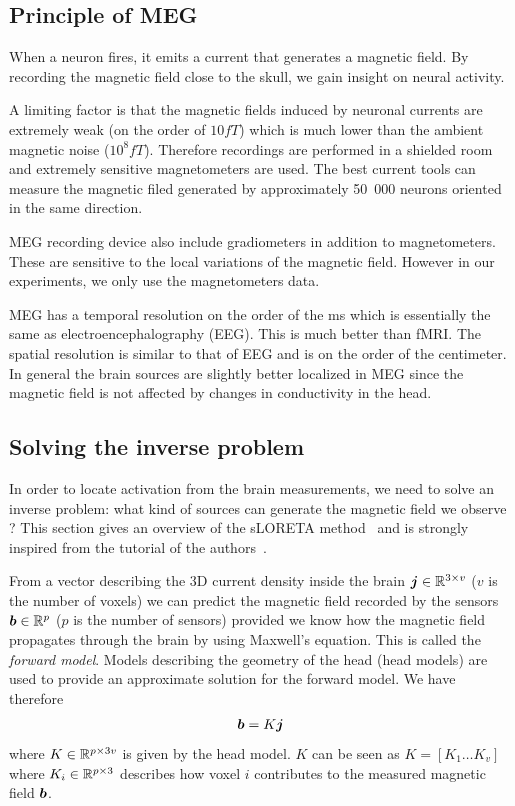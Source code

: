 \subsection{Principle of MEG}
When a neuron fires, it emits a current that generates a magnetic field. By
recording the magnetic field close to the skull, we gain insight on neural
activity.

A limiting factor is that the magnetic fields induced by neuronal currents are
extremely weak (on the order of $10 fT$) which is much lower than the ambient magnetic noise ($10^8 fT$). Therefore recordings are performed in a shielded room and extremely sensitive magnetometers are used.
The best current tools can measure the magnetic filed generated by approximately 50~000 neurons oriented in the same direction.

MEG recording device also include gradiometers in addition to magnetometers.
These are sensitive to the local variations of the magnetic field. However in our experiments, we only use the magnetometers data.

MEG has a temporal resolution on the order of the ms which is essentially the same as electroencephalography (EEG). This is much better than fMRI. The spatial
resolution is similar to that of EEG and is on the order of the centimeter.
In general the brain sources are slightly better localized in MEG since the
magnetic field is not affected by changes in conductivity in the head.


\subsection{Solving the inverse problem}
In order to locate activation from the brain measurements, we need to solve an inverse problem: what kind of sources can generate the magnetic field we
observe ? This section gives an overview of the sLORETA
method~\cite{pascual2002standardized} and is strongly inspired from the tutorial
of the authors~\cite{pascual2007discrete}.

From a vector describing the 3D current density inside the brain $\boldsymbol{j} \in \mathbb{R}^{3 \times v}$
($v$ is the number of voxels) we
can predict the magnetic field recorded by the sensors $\boldsymbol{b} \in \mathbb{R}^p$ ($p$ is the number of sensors) provided
we know how the magnetic field propagates through the brain by using Maxwell's
equation. This is called the \emph{forward model}. Models describing the
geometry of the head (head models) are used to provide an approximate solution for the forward model.
We have therefore
\begin{align}
  \boldsymbol{b} = K \boldsymbol{j}
  \label{eq:maxwell}
\end{align}
where $K \in \mathbb{R}^{p \times 3v}$ is given by the head model.
$K$ can be seen as $K  = [K_1 \dots K_{v}]$ where $K_i \in \mathbb{R}^{p \times 3}$ describes how voxel $i$ contributes to the measured magnetic field $\boldsymbol{b}$.


